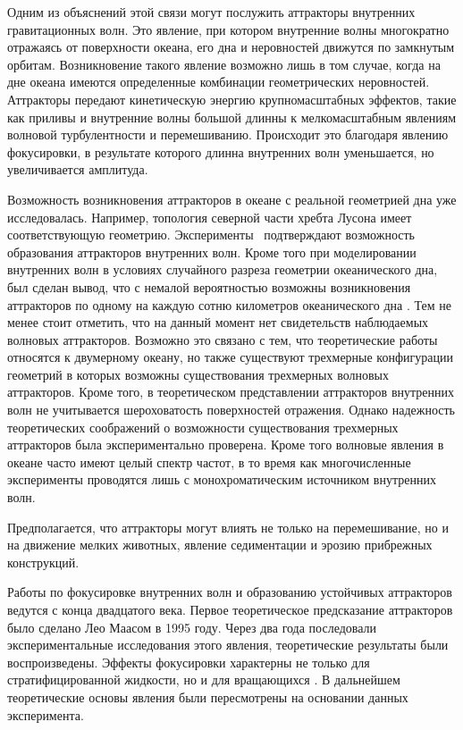 Одним из объяснений этой связи могут послужить аттракторы внутренних гравитационных волн. Это явление, при котором внутренние волны многократно отражаясь от поверхности океана, его дна и неровностей движутся по замкнутым орбитам. Возникновение такого явление возможно лишь в том случае, когда на дне океана имеются определенные комбинации геометрических неровностей. Аттракторы передают кинетическую энергию крупномасштабных эффектов, такие как приливы и внутренние волны большой длинны к мелкомасштабным явлениям волновой турбулентности и перемешиванию. Происходит это благодаря явлению фокусировки, в результате которого длинна внутренних волн уменьшается, но увеличивается амплитуда.

Возможность возникновения аттракторов в океане с реальной геометрией дна уже исследовалась\cite{Tang2010}. Например, топология северной части хребта Лусона имеет соответствующую геометрию. Эксперименты~\cite{ECHEVERRI2011} подтверждают возможность образования аттракторов внутренних волн. Кроме того при моделировании внутренних волн в условиях случайного разреза геометрии океанического дна, был сделан вывод, что с немалой вероятностью возможны возникновения аттракторов по одному на каждую сотню километров океанического дна \cite{Guo2015}. Тем не менее стоит отметить, что на данный момент нет свидетельств наблюдаемых волновых аттракторов. Возможно это связано с тем, что теоретические работы\cite{Guo2015} относятся к двумерному океану, но также существуют трехмерные конфигурации геометрий в которых возможны существования трехмерных волновых аттракторов\cite{Drijfhout2007,Manders2004}. Кроме того, в теоретическом представлении аттракторов внутренних волн не учитывается шероховатость поверхностей отражения. Однако надежность теоретических соображений о возможности существования трехмерных аттракторов была экспериментально проверена\cite{Hazewinkel2010}. Кроме того волновые явления в океане часто имеют целый спектр частот\cite{Garrett1972}, в то время как многочисленные эксперименты проводятся лишь с монохроматическим источником внутренних волн.

Предполагается, что аттракторы могут влиять не только на перемешивание, но и на движение мелких животных, явление седиментации и эрозию прибрежных конструкций.

Работы по фокусировке внутренних волн и образованию устойчивых аттракторов ведутся с конца двадцатого века. Первое теоретическое предсказание аттракторов было сделано Лео Маасом в 1995 году\cite{Maas1995}. Через два года последовали экспериментальные исследования этого явления, теоретические результаты были воспроизведены\cite{Maas1997}. Эффекты фокусировки характерны не только для стратифицированной жидкости, но и для вращающихся \cite{articleMaas2003,Veronis1970}. В дальнейшем теоретические основы явления были пересмотрены на основании данных эксперимента\cite{Lam2008}.

